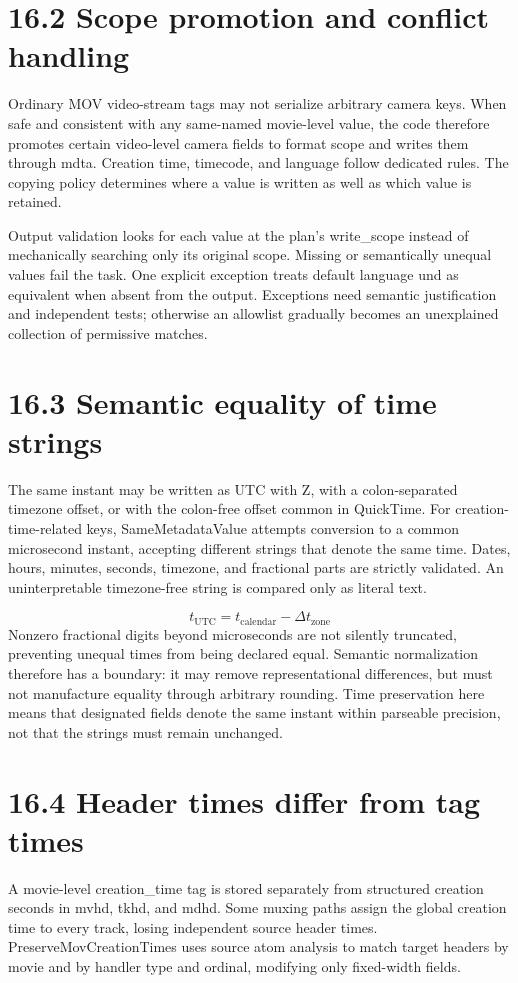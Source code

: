\documentclass[11pt,a4paper,openany]{book}
\begin{document}
\section*{16.2 Scope promotion and conflict handling}
Ordinary MOV video-stream tags may not serialize arbitrary camera keys. When safe and consistent with any same-named movie-level value, the code therefore promotes certain video-level camera fields to format scope and writes them through mdta. Creation time, timecode, and language follow dedicated rules. The copying policy determines where a value is written as well as which value is retained.

Output validation looks for each value at the plan's write\_scope instead of mechanically searching only its original scope. Missing or semantically unequal values fail the task. One explicit exception treats default language und as equivalent when absent from the output. Exceptions need semantic justification and independent tests; otherwise an allowlist gradually becomes an unexplained collection of permissive matches.


\section*{16.3 Semantic equality of time strings}
The same instant may be written as UTC with Z, with a colon-separated timezone offset, or with the colon-free offset common in QuickTime. For creation-time-related keys, SameMetadataValue attempts conversion to a common microsecond instant, accepting different strings that denote the same time. Dates, hours, minutes, seconds, timezone, and fractional parts are strictly validated. An uninterpretable timezone-free string is compared only as literal text.


\begin{equation}
t_{\mathrm{UTC}}=t_{\mathrm{calendar}}-\Delta t_{\mathrm{zone}}
\end{equation}
Nonzero fractional digits beyond microseconds are not silently truncated, preventing unequal times from being declared equal. Semantic normalization therefore has a boundary: it may remove representational differences, but must not manufacture equality through arbitrary rounding. Time preservation here means that designated fields denote the same instant within parseable precision, not that the strings must remain unchanged.


\section*{16.4 Header times differ from tag times}
A movie-level creation\_time tag is stored separately from structured creation seconds in mvhd, tkhd, and mdhd. Some muxing paths assign the global creation time to every track, losing independent source header times. PreserveMovCreationTimes uses source atom analysis to match target headers by movie and by handler type and ordinal, modifying only fixed-width fields.
\end{document}
